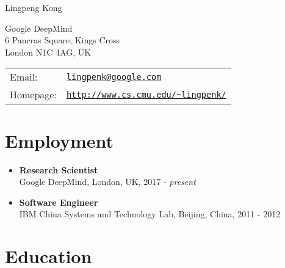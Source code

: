 \documentclass[letterpaper]{article}
\def\name{Lingpeng Kong}
\begin{document}
{\huge \name}


\vspace{0.25in}

\begin{minipage}{0.45\linewidth}
  Google DeepMind \\
  6 Pancras Square, Kings Cross\\
  London N1C 4AG, UK
\end{minipage}
\begin{minipage}{0.45\linewidth}
  \begin{tabular}{ll}
    Email: & \href{mailto:lingpenk@google.com}{\tt lingpenk@google.com} \\
    Homepage: & \href{http://www.cs.cmu.edu/~lingpenk/}{\tt http://www.cs.cmu.edu/\~{}lingpenk/} \\
  \end{tabular}
\end{minipage}

\section*{Employment}
\begin{itemize}
  \item \textbf{Research Scientist}\\
  Google DeepMind, London, UK, 2017 - \emph{present}
\end{itemize}
\begin{itemize}
  \item \textbf{Software Engineer}\\
  IBM China Systems and Technology Lab, Beijing, China, 2011 - 2012
\end{itemize}

\section*{Education}
\end{document}

